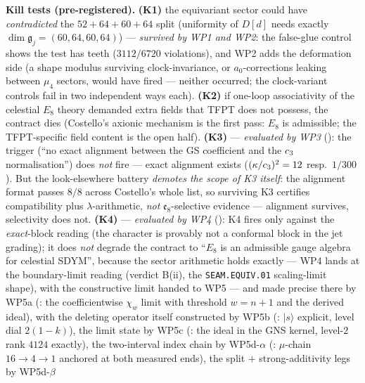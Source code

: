 \par\smallskip\noindent\textbf{Kill tests (pre-registered).} \textbf{(K1)} the equivariant sector could
have \emph{contradicted} the $52{+}64{+}60{+}64$ split (uniformity of $D[d]$ needs exactly
$\dim\mathfrak g_j=(60,64,60,64)$) --- \emph{survived by WP1 and WP2}: the false-glue control shows the
test has teeth ($3112/6720$ violations), and WP2 adds the deformation side (a shape modulus surviving
clock-invariance, or $a_0$-corrections leaking between $\mu_4$ sectors, would have fired --- neither
occurred; the clock-variant controls fail in two independent ways each). \textbf{(K2)} if one-loop
associativity of the celestial
$E_8$ theory demanded extra fields that TFPT does not possess, the contract dies (Costello's axionic
mechanism is the first pass: $E_8$ is admissible; the TFPT-specific field content is the open half).
\textbf{(K3)} --- \emph{evaluated by WP3} (): the trigger
(``no exact alignment between the GS coefficient and the $c_3$ normalisation'') does \emph{not} fire
--- exact alignment exists ($(\kappa/c_3)^2=12$ resp.\ $1/300$). But the look-elsewhere battery
\emph{demotes the scope of K3 itself}: the alignment format passes $8/8$ across Costello's whole list, so
surviving K3 certifies compatibility plus $\lambda$-arithmetic, \emph{not} $\mathfrak e_8$-selective
evidence --- alignment survives, selectivity does not.
\textbf{(K4)} --- \emph{evaluated by WP4} (): K4 fires
only against the \emph{exact}-block reading (the character is provably not a conformal block in the jet
grading); it does \emph{not} degrade the contract to ``$E_8$ is an admissible gauge algebra for celestial
SDYM'', because the sector arithmetic holds exactly --- WP4 lands at the boundary-limit reading (verdict
B(ii), the \texttt{SEAM.EQUIV.01} scaling-limit shape), with the constructive limit handed to WP5 ---
and made precise there by WP5a (: the coefficientwise
$\chi_w$ limit with threshold $w=n{+}1$ and the derived ideal), with the deleting operator itself
constructed by WP5b (: $|s\rangle$ explicit, level
dial $2(1{-}k)$), the limit state by WP5c
(: the ideal in the GNS kernel, level-$2$ rank
$4124$ exactly), the two-interval index chain by WP5d-$\alpha$
(: $\mu$-chain $16\to4\to1$ anchored at both
measured ends), the split $+$ strong-additivity legs by WP5d-$\beta$
